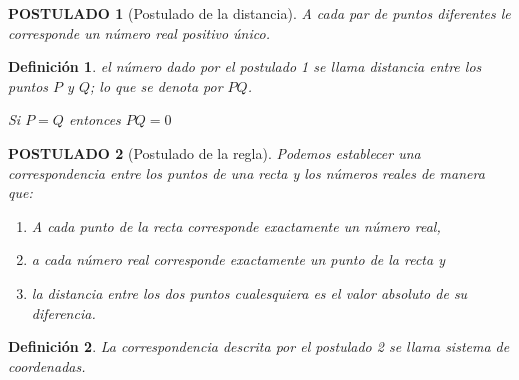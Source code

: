 \documentclass[10pt]{book}
\newtheorem{def.}{\textbf{Definición}}[chapter]%
\newtheorem{post}{\textbf{POSTULADO}}[part]%
\begin{document}
\begin{tcolorbox}
\begin{post}[Postulado de la distancia] A cada par de puntos diferentes le corresponde un número real positivo único.\\
\end{post}

\begin{def.}
el número dado por el postulado 1 se llama distancia entre los puntos $P$ y $Q$; lo que se denota por $PQ$.\\
\begin{center}
Si $P=Q$ entonces $PQ=0$
\end{center}
\end{def.}
\end{tcolorbox}

\begin{tcolorbox}
\begin{post}[Postulado de la regla] Podemos establecer una correspondencia entre los puntos de una recta y los números reales de manera que:
\begin{enumerate}[\bfseries a)]
\item A cada punto de la recta corresponde exactamente un número real,
\item a cada número real corresponde exactamente un punto de la recta y
\item la distancia entre los dos puntos cualesquiera es el valor absoluto de su diferencia.\\
\end{enumerate}
\end{post}
\begin{def.}
La correspondencia descrita por el postulado 2 se llama sistema de coordenadas.
\begin{center}
\end{center}
\end{def.}
\end{tcolorbox}
\end{document}
